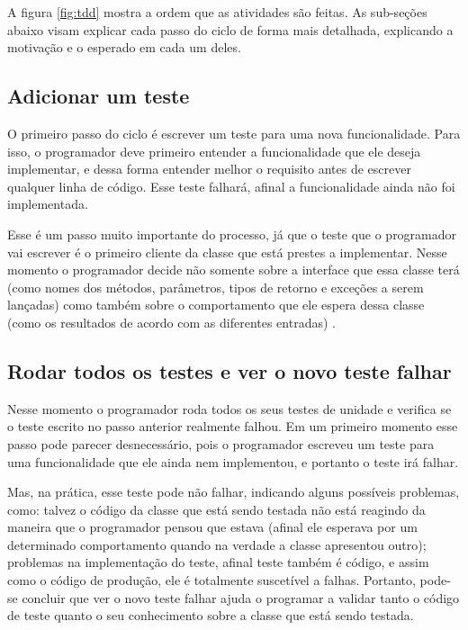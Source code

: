 A figura \ref{fig:tdd} mostra a ordem que as atividades são feitas. 
As sub-seções abaixo visam explicar cada passo do ciclo de forma mais detalhada, explicando a motivação e o esperado 
em cada um deles.

\subsection{Adicionar um teste}

O primeiro passo do ciclo é escrever um teste para uma nova funcionalidade. Para isso, o programador deve primeiro entender a funcionalidade 
que ele deseja implementar, e dessa forma entender melhor o requisito antes de escrever qualquer linha de código.
Esse teste falhará, afinal a funcionalidade ainda não foi implementada. 

Esse é um passo muito importante do processo, já que o teste que o programador vai escrever é o primeiro cliente da classe que está
prestes a implementar. Nesse momento o programador decide não somente sobre a interface que essa classe terá (como nomes dos métodos,
parâmetros, tipos de retorno e exceções a serem lançadas) como também sobre o comportamento que ele espera dessa classe (como 
os resultados de acordo com as diferentes entradas) \cite{GOOS}.

\subsection{Rodar todos os testes e ver o novo teste falhar}

Nesse momento o programador roda todos os seus testes de unidade e verifica se o teste escrito no passo anterior realmente falhou. Em um
primeiro momento esse passo pode parecer desnecessário, pois o programador escreveu um teste para uma funcionalidade que ele ainda nem
implementou, e portanto o teste irá falhar. 

Mas, na prática, esse teste pode não falhar, indicando alguns possíveis problemas, como: talvez o código da classe que está sendo testada
não está reagindo da maneira que o programador pensou que estava (afinal ele esperava por um determinado comportamento quando na verdade a
classe apresentou outro); problemas na implementação do teste, afinal teste também é código, e assim como o código de produção, ele é
totalmente suscetível a falhas.
Portanto, pode-se concluir que ver o novo teste falhar ajuda o programar a validar tanto o código de teste quanto o seu conhecimento
sobre a classe que está sendo testada. 

